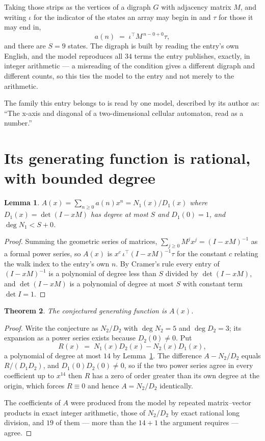 \documentclass[11pt,a4paper]{article}
\theoremstyle{plain}
\newtheorem{theorem}{Theorem}
\newtheorem{lemma}[theorem]{Lemma}
\theoremstyle{definition}
\begin{document}
Taking those strips as the vertices of a digraph $G$ with adjacency matrix $M$, and writing
$\iota$ for the indicator of the states an array may begin in and $\tau$ for those it may end
in,
\[
a(n)\;=\;\iota^{\!\top}M^{\,n-0+0}\tau ,
\]
and there are $S=9$ states. The digraph is built by reading the entry's own English, and the
model reproduces all $34$ terms the entry publishes, exactly, in integer arithmetic --- a
misreading of the condition gives a different digraph and different counts, so this ties the
model to the entry and not merely to the arithmetic.

The family this entry belongs to is read by one model, described by its author as: ``The x-axis and diagonal of a two-dimensional cellular automaton, read as a number.''


\section{Its generating function is rational, with bounded degree}

\begin{lemma}\label{lem:rat}
$A(x)=\sum_{n\ge0}a(n)x^n=N_1(x)/D_1(x)$ where $D_1(x)=\det(I-xM)$ has degree at most
$S$ and $D_1(0)=1$, and $\deg N_1<S+0$.
\end{lemma}

\begin{proof}
Summing the geometric series of matrices, $\sum_{j\ge0}M^jx^j=(I-xM)^{-1}$ as a formal
power series, so $A(x)$ is $x^{c}\,\iota^{\!\top}(I-xM)^{-1}\tau$ for the constant $c$
relating the walk index to the entry's own $n$. By Cramer's rule every entry of
$(I-xM)^{-1}$ is a polynomial of degree less than $S$ divided by $\det(I-xM)$, and
$\det(I-xM)$ is a polynomial of degree at most $S$ with constant term $\det I=1$.
\end{proof}

\begin{theorem}
The conjectured generating function is $A(x)$.
\end{theorem}

\begin{proof}
Write the conjecture as $N_2/D_2$ with $\deg N_2=5$ and $\deg D_2=3$; its expansion as a
power series exists because $D_2(0)\neq0$. Put
\[
R(x)\;=\;N_1(x)D_2(x)-N_2(x)D_1(x),
\]
a polynomial of degree at most $14$ by Lemma~\ref{lem:rat}. The difference
$A-N_2/D_2$ equals $R/(D_1D_2)$, and $D_1(0)D_2(0)\neq0$, so if the two power series agree in
every coefficient up to $x^{14}$ then $R$ has a zero of order greater than its own
degree at the origin, which forces $R\equiv0$ and hence $A=N_2/D_2$ identically.

The coefficients of $A$ were produced from the model by repeated matrix--vector products in
exact integer arithmetic, those of $N_2/D_2$ by exact rational long division, and $19$
of them --- more than the $14+1$ the argument requires --- agree.
\end{proof}
\end{document}
